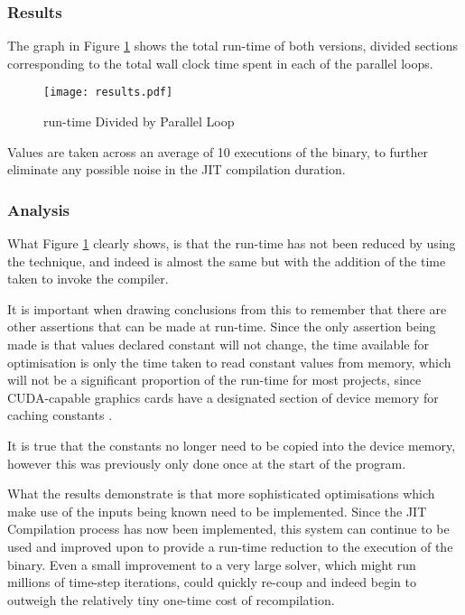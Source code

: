 \subsubsection{Results}
The graph in Figure \ref{fig:res} shows the total run-time of both versions, divided sections corresponding to the total wall clock time spent in each of the parallel loops.

\begin{figure}[h!]
\begin{center}
\caption{run-time Divided by Parallel Loop}
\label{fig:res}
\texttt{[image: results.pdf]}
\end{center}
\vspace{-1cm}
\end{figure}

\noindent Values are taken across an average of 10 executions of the binary, to further eliminate any possible noise in the JIT compilation duration.

\subsubsection{Analysis}
What Figure \ref{fig:res} clearly shows, is that the run-time has not been reduced by using the technique, and indeed is almost the same but with the addition of the time taken to invoke the compiler.
\par
It is important when drawing conclusions from this to remember that there are other assertions that can be made at run-time. Since the only assertion being made is that values declared constant will not change, the time available for optimisation is only the time taken to read constant values from memory, which will not be a significant proportion of the run-time for most projects, since CUDA-capable graphics cards have a designated section of device memory for caching constants \cite[p73]{guide}.
\par
It is true that the constants no longer need to be copied into the device memory, however this was previously only done once at the start of the program.
\par
What the results demonstrate is that more sophisticated optimisations which make use of the inputs being known need to be implemented. Since the JIT Compilation process has now been implemented, this system can continue to be used and improved upon to provide a run-time reduction to the execution of the binary. Even a small improvement to a very large solver, which might run millions of time-step iterations, could quickly re-coup and indeed begin to outweigh the relatively tiny one-time cost of recompilation.
